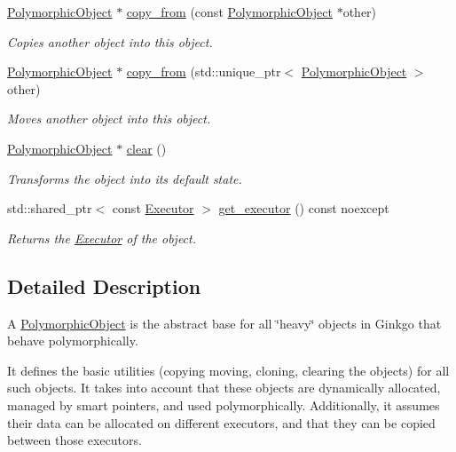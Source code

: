 \begin{DoxyCompactItemize}
\hyperlink{classgko_1_1PolymorphicObject}{Polymorphic\+Object} $\ast$ \hyperlink{classgko_1_1PolymorphicObject_a5e6f713938293cfbe788d00480eb4d81}{copy\+\_\+from} (const \hyperlink{classgko_1_1PolymorphicObject}{Polymorphic\+Object} $\ast$other)
\begin{DoxyCompactList}\small\item\em Copies another object into this object. \end{DoxyCompactList}\item 
\hyperlink{classgko_1_1PolymorphicObject}{Polymorphic\+Object} $\ast$ \hyperlink{classgko_1_1PolymorphicObject_ae6ba40d3fb5e1e73cd92f4830a34c999}{copy\+\_\+from} (std\+::unique\+\_\+ptr$<$ \hyperlink{classgko_1_1PolymorphicObject}{Polymorphic\+Object} $>$ other)
\begin{DoxyCompactList}\small\item\em Moves another object into this object. \end{DoxyCompactList}\item 
\hyperlink{classgko_1_1PolymorphicObject}{Polymorphic\+Object} $\ast$ \hyperlink{classgko_1_1PolymorphicObject_a8bb6f9995e8166099ca3ecab51d98df5}{clear} ()
\begin{DoxyCompactList}\small\item\em Transforms the object into its default state. \end{DoxyCompactList}\item 
std\+::shared\+\_\+ptr$<$ const \hyperlink{classgko_1_1Executor}{Executor} $>$ \hyperlink{classgko_1_1PolymorphicObject_ab40586bff071b7f11c2cf6b5cbf598eb}{get\+\_\+executor} () const noexcept
\begin{DoxyCompactList}\small\item\em Returns the \hyperlink{classgko_1_1Executor}{Executor} of the object. \end{DoxyCompactList}\end{DoxyCompactItemize}


\subsection{Detailed Description}
A \hyperlink{classgko_1_1PolymorphicObject}{Polymorphic\+Object} is the abstract base for all \char`\"{}heavy\char`\"{} objects in Ginkgo that behave polymorphically. 

It defines the basic utilities (copying moving, cloning, clearing the objects) for all such objects. It takes into account that these objects are dynamically allocated, managed by smart pointers, and used polymorphically. Additionally, it assumes their data can be allocated on different executors, and that they can be copied between those executors.

